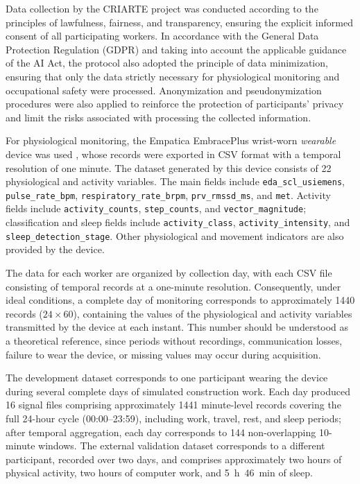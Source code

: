 \documentclass[a4paper,fleqn]{cas-sc}
\newcommand{\newtextorange}[1]{{\color{revorange}#1}}
\begin{document}
Data collection by the CRIARTE project was conducted according to the principles of lawfulness, fairness, and transparency, ensuring the explicit informed consent of all participating workers. In accordance with the General Data Protection Regulation (GDPR) and taking into account the applicable guidance of the AI Act, the protocol also adopted the principle of data minimization, ensuring that only the data strictly necessary for physiological monitoring and occupational safety were processed. Anonymization and pseudonymization procedures were also applied to reinforce the protection of participants' privacy and limit the risks associated with processing the collected information.

For physiological monitoring, the Empatica EmbracePlus wrist-worn \textit{wearable} device was used \cite{empatica_embraceplus}, whose records were exported in CSV format with a temporal resolution of one minute. The dataset generated by this device consists of 22 physiological and activity variables. The main fields include \texttt{eda\_scl\_usiemens}, \texttt{pulse\_rate\_bpm}, \texttt{respiratory\_rate\_brpm}, \texttt{prv\_rmssd\_ms}, and \texttt{met}. Activity fields include \texttt{activity\_counts}, \texttt{step\_counts}, and \texttt{vector\_magnitude}; classification and sleep fields include \texttt{activity\_class}, \texttt{activity\_intensity}, and \texttt{sleep\_detection\_stage}. Other physiological and movement indicators are also provided by the device.

The data for each worker are organized by collection day, with each CSV file consisting of temporal records at a one-minute resolution. Consequently, under ideal conditions, a complete day of monitoring corresponds to approximately 1440 records ($24 \times 60$), containing the values of the physiological and activity variables transmitted by the device at each instant. This number should be understood as a theoretical reference, since periods without recordings, communication losses, failure to wear the device, or missing values may occur during acquisition.

\newtextorange{The development dataset corresponds to one participant wearing the device during several complete days of simulated construction work. Each day produced 16 signal files comprising approximately 1441 minute-level records covering the full 24-hour cycle (00:00--23:59), including work, travel, rest, and sleep periods; after temporal aggregation, each day corresponds to 144 non-overlapping 10-minute windows. The external validation dataset corresponds to a different participant, recorded over two days, and comprises approximately two hours of physical activity, two hours of computer work, and 5~h~46~min of sleep.}
\end{document}
